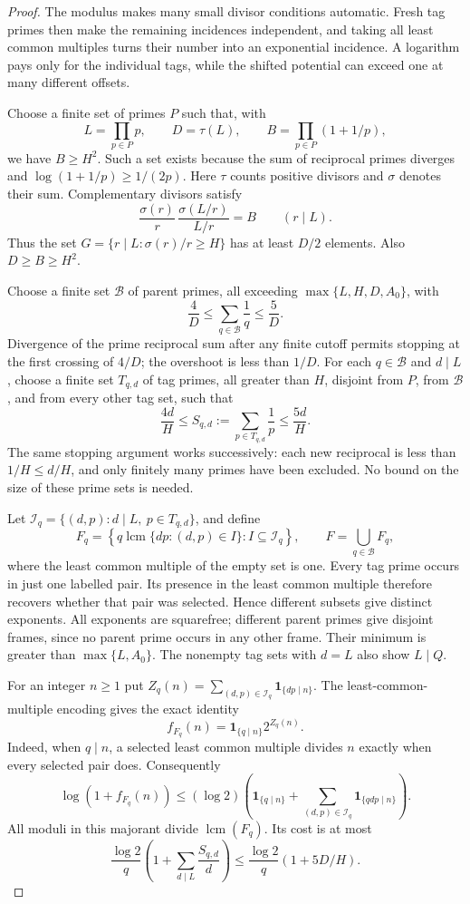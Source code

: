 \begin{proof}
The modulus makes many small divisor conditions automatic.  Fresh tag
primes then make the remaining incidences independent, and taking all
least common multiples turns their number into an exponential incidence.
A logarithm pays only for the individual tags, while the shifted potential
can exceed one at many different offsets.

Choose a finite set of primes $P$ such that, with
\[
 L=\prod_{p\in P}p,\qquad D=\tau(L),\qquad
 B=\prod_{p\in P}(1+1/p),
\]
we have $B\ge H^2$.  Such a set exists because the sum of reciprocal primes
diverges and $\log(1+1/p)\ge1/(2p)$.
Here $\tau$ counts positive divisors and $\sigma$ denotes their sum.
Complementary divisors satisfy
\[
 \frac{\sigma(r)}r\,
 \frac{\sigma(L/r)}{L/r}=B\qquad(r\mid L).
\]
Thus the set
$G=\{r\mid L:\sigma(r)/r\ge H\}$ has at least $D/2$ elements.
Also $D\ge B\ge H^2$.

Choose a finite set $\mathcal B$ of parent primes, all exceeding
$\max\{L,H,D,A_0\}$, with
\[
 \frac4D\le\sum_{q\in\mathcal B}\frac1q\le\frac5D.
\]
Divergence of the prime reciprocal sum after any finite cutoff permits
stopping at the first crossing of $4/D$; the overshoot is less than $1/D$.
For each $q\in\mathcal B$ and $d\mid L$, choose a finite set $T_{q,d}$
of tag primes, all greater than $H$, disjoint from $P$, from $\mathcal B$,
and from every other tag set, such that
\[
 \frac{4d}{H}\le S_{q,d}:=\sum_{p\in T_{q,d}}\frac1p\le\frac{5d}{H}.
\]
The same stopping argument works successively: each new reciprocal is
less than $1/H\le d/H$, and only finitely many primes have been excluded.
No bound on the size of these prime sets is needed.

Let $\mathcal I_q=\{(d,p):d\mid L,\ p\in T_{q,d}\}$, and define
\[
 F_q=\left\{q\operatorname{lcm}\{dp:(d,p)\in I\}:
                         I\subseteq\mathcal I_q\right\},
 \qquad F=\bigcup_{q\in\mathcal B}F_q,
\]
where the least common multiple of the empty set is one.
Every tag prime occurs in just one labelled pair.  Its presence in the
least common multiple therefore recovers whether that pair was selected.
Hence different subsets give distinct exponents.  All exponents are
squarefree; different parent primes give disjoint frames, since no parent
prime occurs in any other frame.  Their minimum is greater than
$\max\{L,A_0\}$.  The nonempty tag sets with $d=L$ also show $L\mid Q$.

For an integer $n\ge1$ put
$Z_q(n)=\sum_{(d,p)\in\mathcal I_q}\mathbf1_{\{dp\mid n\}}$.
The least-common-multiple encoding gives the exact identity
\[
 f_{F_q}(n)=\mathbf1_{\{q\mid n\}}2^{Z_q(n)}.
\]
Indeed, when $q\mid n$, a selected least common multiple divides $n$
exactly when every selected pair does.  Consequently
\[
 \log(1+f_{F_q}(n))
 \le(\log2)\left(\mathbf1_{\{q\mid n\}}
          +\sum_{(d,p)\in\mathcal I_q}\mathbf1_{\{qdp\mid n\}}\right).
\]
All moduli in this majorant divide $\operatorname{lcm}(F_q)$.
Its cost is at most
\begin{equation}
 \frac{\log2}{q}\left(1+\sum_{d\mid L}\frac{S_{q,d}}d\right)
 \le\frac{\log2}{q}(1+5D/H).
 \label{eq:257-parent-log-cost}
\end{equation}


\end{proof}
